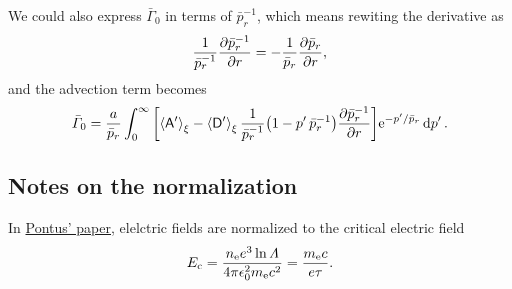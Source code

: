 \documentclass[11pt,a4paper,english
]{article}
\newcommand{\ee}{\mathrm{e}}
\newcommand{\nRE}{\ensuremath{n_{\rm RE}}}
\begin{document}
We could also express $\bar{\varGamma}_0$ in terms of
$\bar{p}_{r}^{-1}$, which means rewiting the derivative as 
\begin{equation}
\frac{1}{\bar{p}_r^{-1}}\pdv{\bar{p}_r^{-1}}{r}=-\frac{1}{\bar{p}_r}\pdv{\bar{p}_r}{r},
\end{equation}
and the advection term becomes
\begin{equation}
\bar\varGamma_{0} =
\frac{a}{\bar{p}_r}
\int_{0}^{\infty}\qty[\ev{\mathsf{A'}}_{\xi} -\ev{\mathsf{D'}}_{\xi}
\frac{1}{\bar{p}_r^{-1}}\qty(1-p'\,\bar{p}_r^{-1})\pdv{\bar{p}_r^{-1}}{r}]
\ee^{-p'/\bar{p}_r}\dd{p'}.
\end{equation}









\subsection{Notes on the normalization}

In \href{https://arxiv.org/abs/2010.07156}{Pontus' paper}, elelctric fields are normalized to the critical
electric field
\begin{equation}
E_{\rm c} = \frac{n_{\ee}e^3\ln\varLambda}{4\pi\epsilon_0^2m_{\ee}c^2}
= \frac{m_{\ee}c}{e\tau}.
\end{equation}




%




\end{document}
